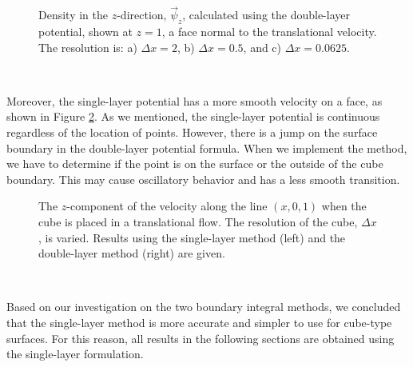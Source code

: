 \begin{figure}[h]
	\begin{center}
	\end{center}
	\caption{Density in the $z$-direction, $\vec{\psi}_z$,  calculated using the double-layer potential, shown at $z=1$, a face normal to the translational velocity. The resolution is: a) $\Delta x = 2$, b) $\Delta x = 0.5$, and c) $\Delta x =  0.0625$.}
	\label{fig_density_cube8_32}
\end{figure}
%
\\
\par
Moreover, the single-layer potential has a more smooth velocity on a face, as shown in Figure \ref{fig_cross_section}. As we mentioned, the single-layer potential is continuous regardless of the location of points. However, there is a jump on the surface boundary in the double-layer potential formula. When we implement the method, we have to determine if the point is on the surface or the outside of the cube boundary. This may cause oscillatory behavior and has a less smooth transition.
\begin{figure}[ht]
	\begin{center}
		
		
		\vspace{0.1cm}
	\end{center}
	\caption{The $z$-component of the velocity along the line $(x,0,1)$ when the cube is placed in a translational flow. The resolution of the cube, $\Delta x$, is varied. Results using the single-layer method (left) and the double-layer method (right) are given. }
	\label{fig_cross_section}
\end{figure}
\\
\par
Based on our investigation on the two boundary integral methods, we concluded that the single-layer method is more accurate and simpler to use for cube-type surfaces.
For this reason, all results in the following sections are obtained using the single-layer formulation. 

